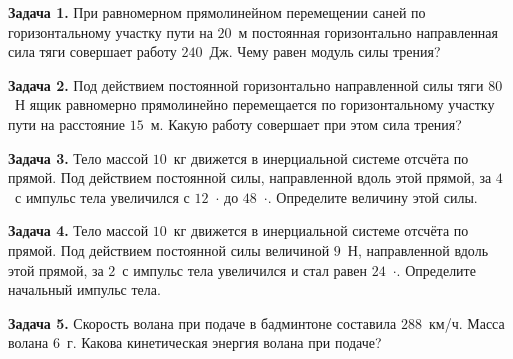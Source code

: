 
\begin{taskbasic}[code={\label{task:dem26_v1_n3}}]
\textbf{Задача 1.} При равномерном прямолинейном перемещении саней по горизонтальному участку пути на $20$~м постоянная горизонтально направленная сила тяги совершает работу $240$~Дж. Чему равен модуль силы трения?

\end{taskbasic}

\begin{taskbasic}[code={\label{task:dem26_v2_n3}}]
\textbf{Задача 2.} Под действием постоянной горизонтально направленной силы тяги $80$~Н ящик равномерно прямолинейно перемещается по горизонтальному участку пути на расстояние $15$~м. Какую работу совершает при этом сила трения?

\end{taskbasic}

\begin{taskbasic}[code={\label{task:dem26_v3_n3}}]
\textbf{Задача 3.} Тело массой $10$~кг движется в инерциальной системе отсчёта по прямой. Под действием постоянной силы, направленной вдоль этой прямой, за $4$~с импульс тела увеличился с $12$~$\cdot$ до $48$~$\cdot$. Определите величину этой силы.

\end{taskbasic}

\begin{taskbasic}[code={\label{task:dem26_v4_n3}}]
\textbf{Задача 4.} Тело массой $10$~кг движется в инерциальной системе отсчёта по прямой. Под действием постоянной силы величиной $9$~Н, направленной вдоль этой прямой, за $2$~с импульс тела увеличился и стал равен $24$~$\cdot$. Определите начальный импульс тела.

\end{taskbasic}

\begin{taskbasic}[code={\label{task:dem26_v5_n3}}]
\textbf{Задача 5.} Скорость волана при подаче в бадминтоне составила $288$~км/ч. Масса волана $6$~г. Какова кинетическая энергия волана при подаче?

\end{taskbasic}


